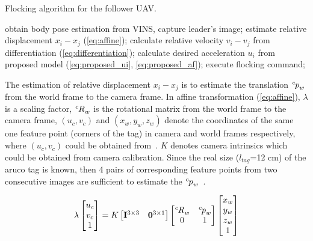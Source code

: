 \begin{algorithm}[h]
  \caption{Flocking algorithm for the follower UAV.}
  \label{alg:a1}
  \begin{algorithmic}[1]
      \State obtain body pose estimation from VINS, capture leader's image;
        \State estimate relative displacement $\mathit{x_i-x_j}$ (\ref{eq:affine});
        \State calculate relative velocity $\mathit{v_i-v_j}$ from differentiation (\ref{eq:differentiation});
        \State calculate desired acceleration $\mathit{u_i}$ from proposed model (\ref{eq:proposed_ui}, \ref{eq:proposed_af});
        \State execute flocking command;
      \EndWhile
    \EndIf
  \end{algorithmic}
\end{algorithm}

The estimation of relative displacement $x_i-x_j$ is to estimate the translation $\tensor*[^c]{p}{_w}$ from the world frame to the camera frame. In affine transformation (\ref{eq:affine}), $\lambda$ is a scaling factor, $\tensor*[^c]{R}{_w}$ is the rotational matrix from the world frame to the camera frame, $(u_c, v_c)$ and $(x_w, y_w, z_w)$ denote the coordinates of the same one feature point (corners of the tag) in camera and world frames respectively, where $(u_c, v_c)$ could be obtained from~\cite{Aruco}. $K$ denotes camera intrinsics which could be obtained from camera calibration. Since the real size ($l_{tag}$=12 cm) of the aruco tag is known, then 4 pairs of corresponding feature points from two consecutive images are sufficient to estimate the $\tensor*[^c]{p}{_w}$~\cite{Hartley2004}.

\begin{equation}\label{eq:affine}
\lambda\begin{bmatrix}u_c\\v_c\\1\end{bmatrix}=K\begin{bmatrix}\mathbf{I}^{3\times3}&\mathbf{0}^{3\times1}\end{bmatrix}\begin{bmatrix}\tensor*[^c]{R}{_w}&\tensor*[^c]{p}{_w}\\0&1\end{bmatrix}\begin{bmatrix}x_w\\y_w\\z_w\\1\end{bmatrix}
\end{equation}

